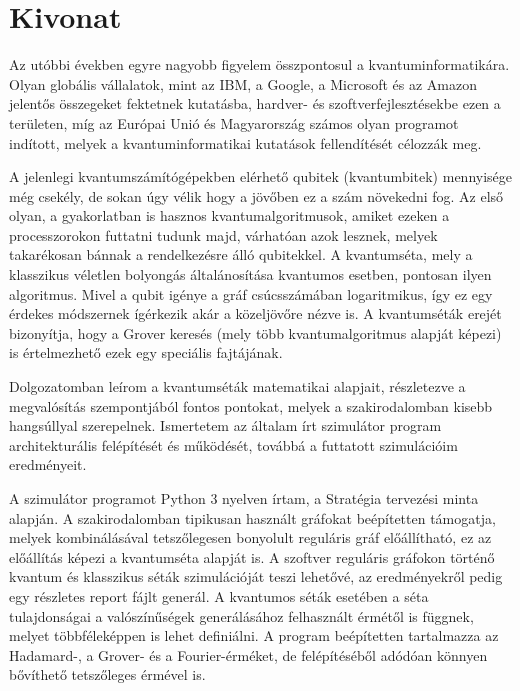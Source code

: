 \setcounter{page}{1}

\selecthungarian

\chapter*{Kivonat}

Az utóbbi években egyre nagyobb figyelem összpontosul a kvantuminformatikára. Olyan globális vállalatok, mint az IBM, a Google, a Microsoft és az Amazon jelentős összegeket fektetnek kutatásba, hardver- és szoftverfejlesztésekbe ezen a területen, míg az Európai Unió és Magyarország számos olyan programot indított, melyek a kvantuminformatikai kutatások fellendítését célozzák meg.

A jelenlegi kvantumszámítógépekben elérhető qubitek (kvantumbitek) mennyisége még csekély, de sokan úgy vélik hogy a jövőben ez a szám növekedni fog. Az első olyan, a gyakorlatban is hasznos kvantumalgoritmusok, amiket ezeken a processzorokon futtatni tudunk majd, várhatóan azok lesznek, melyek takarékosan bánnak a rendelkezésre álló qubitekkel. A kvantumséta, mely a klasszikus véletlen bolyongás általánosítása kvantumos esetben, pontosan ilyen algoritmus. Mivel a qubit igénye a gráf csúcsszámában logaritmikus, így ez egy érdekes módszernek ígérkezik akár a közeljövőre nézve is. A kvantumséták erejét bizonyítja, hogy a Grover keresés (mely több kvantumalgoritmus alapját képezi) is értelmezhető ezek egy speciális fajtájának.

Dolgozatomban leírom a kvantumséták matematikai alapjait, részletezve a megvalósítás szempontjából fontos pontokat, melyek a szakirodalomban kisebb hangsúllyal szerepelnek. Ismertetem az általam írt szimulátor program architekturális felépítését és működését, továbbá a futtatott szimulációim eredményeit.

A szimulátor programot Python 3 nyelven írtam, a Stratégia tervezési minta alapján. A szakirodalomban tipikusan használt gráfokat beépítetten támogatja, melyek kombinálásával tetszőlegesen bonyolult reguláris gráf előállítható, ez az előállítás képezi a kvantumséta alapját is. A szoftver reguláris gráfokon történő kvantum és klasszikus séták szimulációját teszi lehetővé, az eredményekről pedig egy részletes report fájlt generál. A kvantumos séták esetében a séta tulajdonságai a valószínűségek generálásához felhasznált érmétől is függnek, melyet többféleképpen is lehet definiálni. A program beépítetten tartalmazza az Hadamard-, a Grover- és a Fourier-érméket, de felépítéséből adódóan könnyen bővíthető tetszőleges érmével is.

